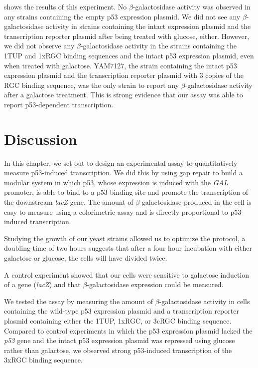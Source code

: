  shows the results of this experiment. No \(\beta\)-galactosidase activity was observed in any strains containing the empty p53 expression plasmid. We did not see any \(\beta\)-galactosidase activity in strains containing the intact expression plasmid and the transcription reporter plasmid after being treated with glucose, either. However, we did not observe any \(\beta\)-galactosidase activity in the strains containing the 1TUP and 1xRGC binding sequences and the intact p53 expression plasmid, even when treated with galactose. YAM7127, the strain containing the intact p53 expression plasmid and the transcription reporter plasmid with \num{3} copies of the RGC binding sequence, was the only strain to report any \(\beta\)-galactosidase activity after a galactose treatment. This is strong evidence that our assay was able to report p53-dependent transcription. 

\section{Discussion}

In this chapter, we set out to design an experimental assay to quantitatively measure p53-induced transcription. We did this by using gap repair to build a modular system in which p53, whose expression is induced with the \textit{GAL} promoter, is able to bind to a p53-binding site and promote the transcription of the downstream \textit{lacZ} gene. The amount of \(\beta\)-galactosidase produced in the cell is easy to measure using a colorimetric assay and is directly proportional to p53-induced transcription.

Studying the growth of our yeast strains allowed us to optimize the protocol, a doubling time of two hours suggests that after a four hour incubation with either galactose or glucose, the cells will have divided twice.

A control experiment showed that our cells were sensitive to galactose induction of a gene (\textit{lacZ}) and that \(\beta\)-galactosidase expression could be measured.

We tested the assay by measuring the amount of \(\beta\)-galactosidase activity in cells containing the wild-type p53 expression plasmid and a transcription reporter plasmid containing either the 1TUP, 1xRGC, or 3cRGC binding sequence. Compared to  control experiments in which the p53 expression plasmid lacked the \textit{p53} gene and the intact p53 expression plasmid was repressed using glucose rather than galactose, we observed strong p53-induced transcription of the 3xRGC binding sequence.

